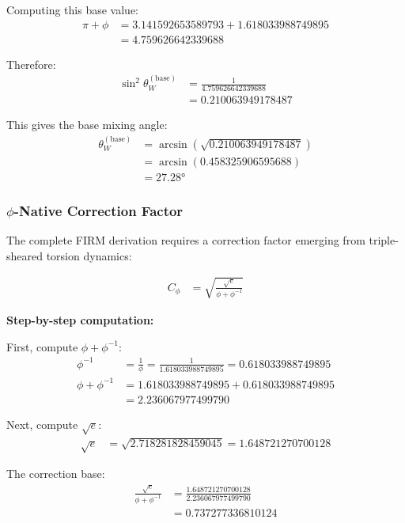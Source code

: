 Computing this base value:
\begin{align}
\pi + \phi &= 3.141592653589793 + 1.618033988749895 \\
&= 4.759626642339688
\end{align}

Therefore:
\begin{align}
\sin^2\theta_W^{(\text{base})} &= \frac{1}{4.759626642339688} \\
&= 0.210063949178487
\end{align}

This gives the base mixing angle:
\begin{align}
\theta_W^{(\text{base})} &= \arcsin(\sqrt{0.210063949178487}) \\
&= \arcsin(0.458325906595688) \\
&= 27.28°
\end{align}

\subsubsection{$\phi$-Native Correction Factor}

The complete FIRM derivation requires a correction factor emerging from triple-sheared torsion dynamics:

\begin{align}
C_{\phi} &= \sqrt{\frac{\sqrt{e}}{\phi + \phi^{-1}}} \tag{$\phi$-native correction}
\end{align}

\textbf{Step-by-step computation:}

First, compute $\phi + \phi^{-1}$:
\begin{align}
\phi^{-1} &= \frac{1}{\phi} = \frac{1}{1.618033988749895} = 0.618033988749895 \\
\phi + \phi^{-1} &= 1.618033988749895 + 0.618033988749895 \\
&= 2.236067977499790
\end{align}

Next, compute $\sqrt{e}$:
\begin{align}
\sqrt{e} &= \sqrt{2.718281828459045} = 1.648721270700128
\end{align}

The correction base:
\begin{align}
\frac{\sqrt{e}}{\phi + \phi^{-1}} &= \frac{1.648721270700128}{2.236067977499790} \\
&= 0.737277336810124
\end{align}

